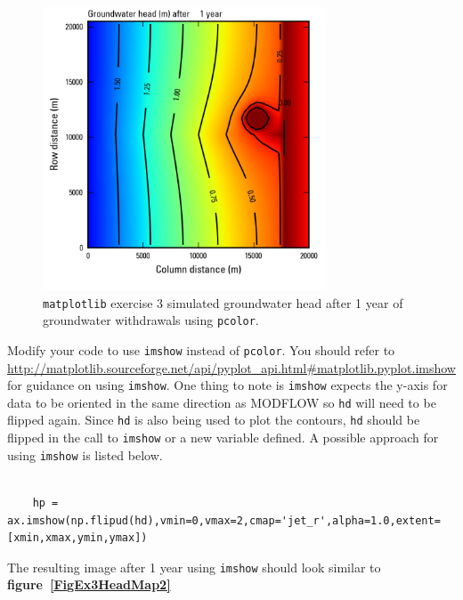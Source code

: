 \documentclass[12pt]{article}
\begin{document}
\begin{figure}
	\centering
  	\includegraphics[width=0.75\textwidth]{../figures.MF/Head_36865.png}
 	\caption{\texttt{matplotlib} exercise 3 simulated groundwater head after 1 year of groundwater withdrawals using \texttt{pcolor}.}
	\label{FigEx3HeadMap}
\end{figure}

Modify your code to use \texttt{imshow} instead of \texttt{pcolor}. You should refer to \url{http://matplotlib.sourceforge.net/api/pyplot_api.html\#matplotlib.pyplot.imshow} for guidance on using  \texttt{imshow}. One thing to note is \texttt{imshow} expects the y-axis for data to be oriented in the same direction as MODFLOW so \texttt{hd} will need to be flipped again. Since \texttt{hd} is also being used to plot the contours, \texttt{hd} should be flipped in the call to \texttt{imshow} or a new variable defined. A possible approach for using \texttt{imshow} is listed below.

\begin{lstlisting}

	hp = ax.imshow(np.flipud(hd),vmin=0,vmax=2,cmap='jet_r',alpha=1.0,extent=[xmin,xmax,ymin,ymax])
\end{lstlisting}

The resulting image after 1 year using \texttt{imshow} should look similar to \textbf{figure~\ref{FigEx3HeadMap2}}
\end{document}
